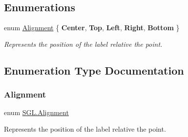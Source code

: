 \subsection*{Enumerations}
\begin{DoxyCompactItemize}
\item 
enum \mbox{\hyperlink{namespace_s_g_l_aa8de446c655c151ef21cfe27b24da87c}{Alignment}} \{ \newline
{\bfseries Center}, 
{\bfseries Top}, 
{\bfseries Left}, 
{\bfseries Right}, 
\newline
{\bfseries Bottom}
 \}
\begin{DoxyCompactList}\small\item\em Represents the position of the label relative the point. \end{DoxyCompactList}\end{DoxyCompactItemize}


\subsection{Enumeration Type Documentation}
\mbox{\label{namespace_s_g_l_aa8de446c655c151ef21cfe27b24da87c}} 
\subsubsection{\texorpdfstring{Alignment}{Alignment}}
{\footnotesize\ttfamily enum \mbox{\hyperlink{namespace_s_g_l_aa8de446c655c151ef21cfe27b24da87c}{S\+G\+L.\+Alignment}}\hspace{0.3cm}{\ttfamily [strong]}}



Represents the position of the label relative the point. 

